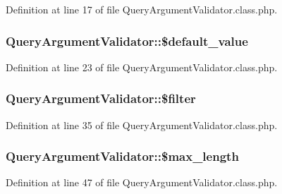 Definition at line 17 of file Query\+Argument\+Validator.\+class.\+php.

\subsubsection[{\texorpdfstring{\$default\+\_\+value}{$default_value}}]{\setlength{\rightskip}{0pt plus 5cm}Query\+Argument\+Validator\+::\$default\+\_\+value}\hypertarget{classQueryArgumentValidator_ae61c68b0a9cd40caa31c464ffddf4ffa}{}\label{classQueryArgumentValidator_ae61c68b0a9cd40caa31c464ffddf4ffa}


Definition at line 23 of file Query\+Argument\+Validator.\+class.\+php.

\subsubsection[{\texorpdfstring{\$filter}{$filter}}]{\setlength{\rightskip}{0pt plus 5cm}Query\+Argument\+Validator\+::\$filter}\hypertarget{classQueryArgumentValidator_a43b0653e37185f392daf500c50484186}{}\label{classQueryArgumentValidator_a43b0653e37185f392daf500c50484186}


Definition at line 35 of file Query\+Argument\+Validator.\+class.\+php.

\subsubsection[{\texorpdfstring{\$max\+\_\+length}{$max_length}}]{\setlength{\rightskip}{0pt plus 5cm}Query\+Argument\+Validator\+::\$max\+\_\+length}\hypertarget{classQueryArgumentValidator_a6c99b1e774c49ebe4cbb5f8671156654}{}\label{classQueryArgumentValidator_a6c99b1e774c49ebe4cbb5f8671156654}


Definition at line 47 of file Query\+Argument\+Validator.\+class.\+php.

